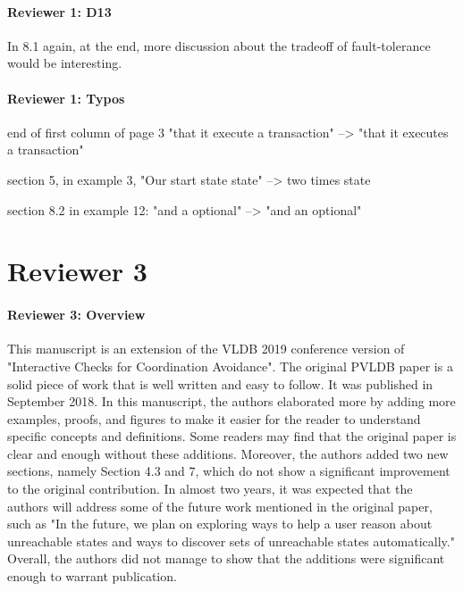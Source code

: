\documentclass[9pt]{article}
\begin{document}
\begin{multicols*}{2}
\paragraph{Reviewer 1: D13}
\begin{feedback}
  In 8.1 again, at the end, more discussion about the tradeoff of
  fault-tolerance would be interesting.
\end{feedback}

\paragraph{Reviewer 1: Typos}
\begin{feedback}
  end of first column of page 3 "that it execute a transaction" --> "that it
  executes a transaction"

  section 5, in example 3, "Our start state state" --> two times state

  section 8.2 in example 12: "and a optional" --> "and an optional"
\end{feedback}

\section*{Reviewer 3}
\paragraph{Reviewer 3: Overview}
\begin{feedback}
  This manuscript is an extension of the VLDB 2019 conference version of
  "Interactive Checks for Coordination Avoidance". The original PVLDB paper is
  a solid piece of work that is well written and easy to follow.  It was
  published in September 2018. In this manuscript, the authors elaborated more
  by adding more examples, proofs, and figures to make it easier for the reader
  to understand specific concepts and definitions. Some readers may find that
  the original paper is clear and enough without these additions. Moreover, the
  authors added two new sections, namely Section 4.3 and 7, which do not show a
  significant improvement to the original contribution. In almost two years, it
  was expected that the authors will address some of the future work mentioned
  in the original paper, such as "In the future, we plan on exploring ways to
  help a user reason about unreachable states and ways to discover sets of
  unreachable states automatically." Overall, the authors did not manage to
  show that the additions were significant enough to warrant publication.
\end{feedback}



\end{multicols*}
\end{document}
